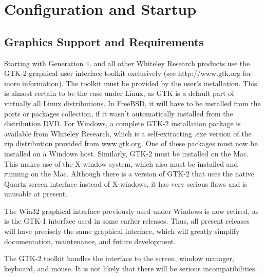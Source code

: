 
\chapter{{\Xic} Configuration and Startup}

\section{Graphics Support and Requirements}

Starting with Generation 4, {\Xic} and all other Whiteley Research
products use the GTK-2 graphical user interface toolkit exclusively
(see {\vt http://www.gtk.org} for more information).  The toolkit must
be provided by the user's installation.  This is almost certain to be
the case under Linux, as GTK is a default part of virtually all Linux
distributions.  In FreeBSD, it will have to be installed from the
ports or packages collection, if it wasn't automatically installed
from the distribution DVD.  For Windows, a complete GTK-2 installation
package is available from Whiteley Research, which is a
self-extracting {\vt .exe} version of the zip distribution provided
from {\vt www.gtk.org}.  One of these packages must now be
installed on a Windows host.  Similarly, GTK-2 must be installed on
the Mac.  This makes use of the X-window system, which also must be
installed and running on the Mac.  Although there is a version of
GTK-2 that uses the native Quartz screen interface instead of
X-windows, it has very serious flaws and is unusable at present.

The Win32 graphical interface previously used under Windows is now
retired, as is the GTK-1 interface used in some earlier releases. 
Thus, all present releases will have precisely the same graphical
interface, which will greatly simplify documentation, maintenance, and
future development.

The GTK-2 toolkit handles the interface to the screen, window manager,
keyboard, and mouse.  It is not likely that there will be serious
incompatibilities.

